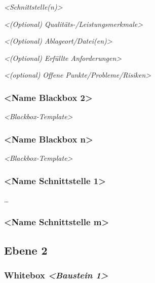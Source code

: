 \documentclass[
]{article}
\begin{document}
\emph{\textless Schnittstelle(n)\textgreater{}}

\emph{\textless(Optional) Qualitäts-/Leistungsmerkmale\textgreater{}}

\emph{\textless(Optional) Ablageort/Datei(en)\textgreater{}}

\emph{\textless(Optional) Erfüllte Anforderungen\textgreater{}}

\emph{\textless(optional) Offene Punkte/Probleme/Risiken\textgreater{}}

\hypertarget{__name_blackbox_2}{%
  \subsubsection{\textless Name Blackbox
    2\textgreater{}}\label{__name_blackbox_2}}

\emph{\textless Blackbox-Template\textgreater{}}

\hypertarget{__name_blackbox_n}{%
  \subsubsection{\textless Name Blackbox
    n\textgreater{}}\label{__name_blackbox_n}}

\emph{\textless Blackbox-Template\textgreater{}}

\hypertarget{__name_schnittstelle_1}{%
  \subsubsection{\textless Name Schnittstelle
    1\textgreater{}}\label{__name_schnittstelle_1}}

\ldots{}

\hypertarget{__name_schnittstelle_m}{%
  \subsubsection{\textless Name Schnittstelle
    m\textgreater{}}\label{__name_schnittstelle_m}}

\hypertarget{_ebene_2}{%
  \subsection{Ebene 2}\label{_ebene_2}}

\hypertarget{_whitebox_emphasis_baustein_1_emphasis}{%
  \subsubsection{\texorpdfstring{Whitebox \emph{\textless Baustein
        1\textgreater{}}}{Whitebox \textless Baustein 1\textgreater{}}}\label{_whitebox_emphasis_baustein_1_emphasis}}
\end{document}
